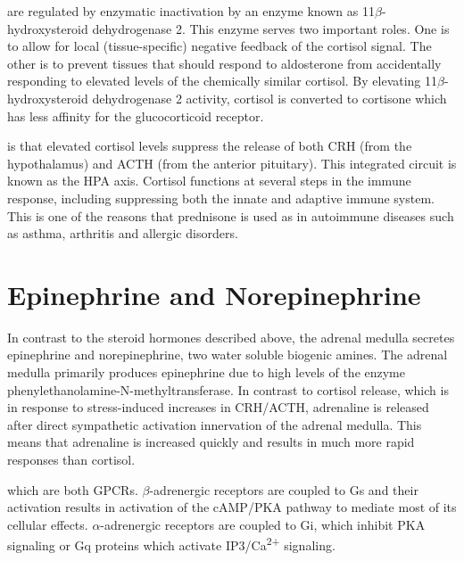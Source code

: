 \documentclass{tufte-handout}
\begin{document}
 are regulated by enzymatic inactivation by an enzyme known as 11$\beta$-hydroxysteroid dehydrogenase 2.  This enzyme serves two important roles.  One is to allow for local (tissue-specific) negative feedback of the cortisol signal.  The other is to prevent tissues that should respond to aldosterone from accidentally responding to elevated levels of the chemically similar cortisol.  By elevating 11$\beta$-hydroxysteroid dehydrogenase 2 activity, cortisol is converted to cortisone which has less affinity for the glucocorticoid receptor.

 is that elevated cortisol levels suppress the release of both CRH (from the hypothalamus) and ACTH (from the anterior pituitary).  This integrated circuit is known as the HPA axis.  Cortisol functions at several steps in the immune response, including suppressing both the innate and adaptive immune system.  This is one of the reasons that prednisone is used as in autoimmune diseases such as asthma, arthritis and allergic disorders.

\section{Epinephrine and Norepinephrine}

In contrast to the steroid hormones described above, the adrenal medulla secretes epinephrine and norepinephrine, two water soluble biogenic amines.  The adrenal medulla primarily produces epinephrine due to high levels of the enzyme phenylethanolamine-N-methyltransferase.  In contrast to cortisol release, which is in response to stress-induced increases in CRH/ACTH, adrenaline is released after direct sympathetic activation innervation of the adrenal medulla.  This means that adrenaline is increased quickly and results in much more rapid responses than cortisol.  

 which are both GPCRs.  $\beta$-adrenergic receptors are coupled to Gs and their activation results in activation of the cAMP/PKA pathway to mediate most of its cellular effects.  $\alpha$-adrenergic receptors are coupled to Gi, which inhibit PKA signaling or Gq proteins which activate IP3/Ca\textsuperscript{2+} signaling.
\end{document}
